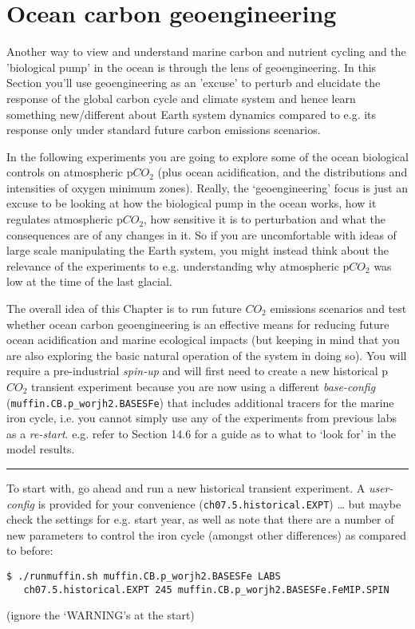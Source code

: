 \section{Ocean carbon geoengineering}

\noindent Another way to view and understand marine carbon and nutrient cycling and the 'biological pump' in the ocean is through the lens of geoengineering. In this Section you'll use geoengineering as an 'excuse' to perturb and elucidate the response of the global carbon cycle and climate system and hence learn something new/different about Earth system dynamics compared to e.g. its response only under standard future carbon emissions scenarios.

In the following experiments you are going to explore some of the ocean biological controls on atmospheric p\(CO_{2}\) (plus ocean acidification, and the distributions and intensities of oxygen minimum zones). Really, the ‘geoengineering’ focus is just an excuse to be looking at how the biological pump in the ocean works, how it regulates atmospheric p\(CO_{2}\), how sensitive it is to perturbation and what the consequences are of any changes in it. So if you are uncomfortable with ideas of large scale manipulating the Earth system, you might instead think about the relevance of the experiments to e.g. understanding why atmospheric p\(CO_{2}\) was low at the time of the last glacial.

The overall idea of this Chapter is to run future \(CO_{2}\) emissions scenarios and test whether ocean carbon geoengineering is an effective means for reducing future ocean acidification and marine ecological impacts (but keeping in mind that you are also exploring the basic natural operation of the system in doing so). You will require a pre-industrial \textit{spin-up} and will first need to create a new historical p\(CO_{2}\) transient experiment because you are now using a different \textit{base-config} (\texttt{muffin.CB.p\_worjh2.BASESFe}) that includes additional tracers for the marine iron cycle, i.e. you cannot simply use any of the experiments from previous labs as a \textit{re-start}. e.g. refer to Section 14.6  for a guide as to what to ‘look for’ in the model results.

\vspace{1mm}
\noindent\rule{4cm}{0.1mm}
\vspace{2mm}

\noindent To start with, go ahead and run a new historical transient experiment. A \textit{user-config} is provided for your convenience (\texttt{ch07.5.historical.EXPT}) … but maybe check the settings for e.g. start year, as well as note that there are a number of new parameters to control the iron cycle (amongst other differences) as compared to before:
\vspace{-2pt}\begin{verbatim}
$ ./runmuffin.sh muffin.CB.p_worjh2.BASESFe LABS
   ch07.5.historical.EXPT 245 muffin.CB.p_worjh2.BASESFe.FeMIP.SPIN
\end{verbatim}\vspace{-2pt}
(ignore the ‘WARNING’s at the start)

